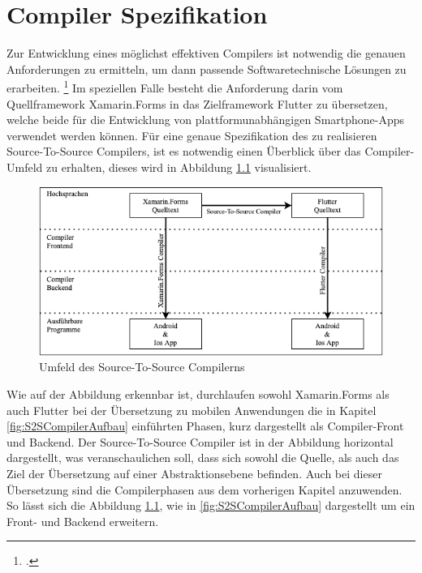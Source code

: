 \chapter{Compiler Spezifikation}
\label{chap:CompilerEntwurf}
Zur Entwicklung eines möglichst effektiven Compilers ist notwendig die genauen Anforderungen zu ermitteln,  um dann passende Softwaretechnische Lösungen zu erarbeiten. \footcite[Vgl.][S.6]{Balzert2011} Im speziellen Falle besteht die Anforderung darin vom Quellframework Xamarin.Forms in das Zielframework Flutter zu übersetzen,  welche beide für die Entwicklung von plattformunabhängigen Smartphone-Apps verwendet werden können.  Für eine genaue Spezifikation des zu realisieren Source-To-Source Compilers,  ist es notwendig einen Überblick über das Compiler-Umfeld zu erhalten,  dieses wird in Abbildung \ref{fig:CompilerArchitecture} visualisiert. 

\begin{figure}[!ht]
 \includegraphics[width=\textwidth,keepaspectratio]{Images/CompilerArchitecture/CompilerStructure.png}
 \caption{Umfeld des Source-To-Source Compilerns}
 \label{fig:CompilerArchitecture}
\end{figure}

Wie auf der Abbildung erkennbar ist,  durchlaufen sowohl Xamarin.Forms als auch Flutter bei der Übersetzung zu mobilen Anwendungen die in Kapitel \ref{fig:S2SCompilerAufbau} einführten Phasen,  kurz dargestellt als Compiler-Front und Backend.  Der Source-To-Source Compiler ist in der Abbildung horizontal dargestellt,  was veranschaulichen soll,  dass sich sowohl die Quelle,  als auch das Ziel der Übersetzung auf einer Abstraktionsebene befinden.  Auch bei dieser Übersetzung sind die Compilerphasen aus dem vorherigen Kapitel anzuwenden.  So lässt sich die Abbildung \ref{fig:CompilerArchitecture},  wie in \ref{fig:S2SCompilerAufbau} dargestellt um ein Front- und Backend erweitern.

